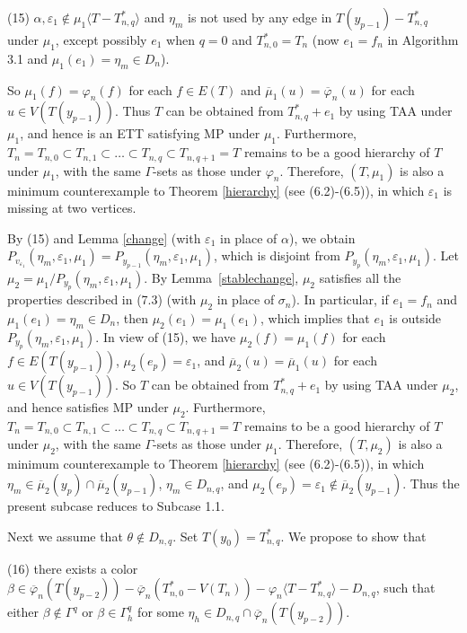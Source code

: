 \documentclass[11pt]{article}
\newcommand{\phibar}{\overline{\varphi}}
\begin{document}
(15) $\alpha, \varepsilon_1 \notin \mu_1 \langle T-T_{n,q}^* \rangle$ and $\eta_m$ is not used by any edge in 
$T(y_{p-1}) -  T_{n,q}^*$ under $\mu_1$, except possibly $e_1$ when $q=0$ and $T_{n,0}^*=T_n$ (now $e_1=f_n$ in 
Algorithm 3.1 and $\mu_1(e_1)=\eta_m \in D_n$). 

So $\mu_1(f)=\varphi_n(f)$ for each $f\in E(T)$ and $\overline{\mu}_1(u)= \overline{\varphi}_n(u)$ for each 
$u\in V(T(y_{p-1}))$. Thus $T$ can be obtained from $T_{n,q}^*+e_1$ by using TAA under $\mu_1$, and hence is an ETT 
satisfying MP under $\mu_1$. Furthermore, $T_n=T_{n,0} \subset T_{n,1} \subset 
\ldots \subset T_{n,q} \subset T_{n,q+1}=T$ remains to be a good hierarchy of $T$ under $\mu_1$, with the same 
$\Gamma$-sets as those under $\varphi_n$. Therefore, $(T, \mu_1)$ is also a minimum counterexample to Theorem 
\ref{hierarchy} (see (6.2)-(6.5)), in which $\varepsilon_1$ is missing at two vertices. 

By (15) and Lemma \ref{change} (with $\varepsilon_1$ in place of $\alpha$), we obtain $P_{v_{\varepsilon_1}}(\eta_m, 
\varepsilon_1, \mu_1) =P_{y_{p-1}}(\eta_m, \varepsilon_1, \mu_1)$, which is disjoint from $P_{y_{p}}(\eta_m, \varepsilon_1, 
\mu_1)$. Let $\mu_2=\mu_1/P_{y_{p}}(\eta_m, \varepsilon_1, \mu_1)$. By Lemma~\ref{stablechange}, $\mu_2$ satisfies all 
the properties described in (7.3) (with $\mu_2$ in place of $\sigma_n$).  
In particular, if $e_1=f_n$ and $\mu_1(e_1)=\eta_m \in D_n$, then $\mu_2(e_1)=\mu_1(e_1)$, which 
implies that $e_1$ is outside $P_{y_{p}}(\eta_m, \varepsilon_1, \mu_1)$.  In view of (15), we have 
$\mu_2(f)=\mu_1(f)$ for each $f\in E(T(y_{p-1}))$, $\mu_2(e_p)=\varepsilon_1$, and $\overline{\mu}_2(u)= \overline{\mu}_1(u)$ 
for each $u\in V(T(y_{p-1}))$. So $T$ can be obtained from $T_{n,q}^*+e_1$ by using TAA under $\mu_2$, and hence satisfies 
MP under $\mu_2$. Furthermore, $T_n=T_{n,0} \subset T_{n,1} \subset \ldots \subset T_{n,q} \subset T_{n,q+1}=T$ 
remains to be a good hierarchy of $T$ under $\mu_2$, with the same $\Gamma$-sets as those under $\mu_1$. 
Therefore, $(T, \mu_2)$ is also a minimum counterexample to Theorem \ref{hierarchy} (see (6.2)-(6.5)), in which $\eta_m \in\overline{\mu}_2(y_p)\cap\overline{\mu}_2(y_{p-1})$,  $\eta_m\in D_{n,q}$, and $\mu_2(e_p)=\varepsilon_1 \notin \overline{\mu}_2(y_{p-1})$. Thus the present subcase reduces to Subcase 1.1. 

Next we assume that $\theta\notin D_{n,q}$. Set $T(y_0)=T_{n,q}^*$. We propose to show that 

(16) there exists a color $\beta \in \overline{\varphi}_n(T(y_{p-2}))- \phibar_n(T_{n,0}^*-V(T_n)) - 
\varphi_n \langle T - T_{n,q}^* \rangle- D_{n,q}$, such that either $\beta \notin \Gamma^{q}$
or $\beta \in \Gamma^{q}_h$ for some $\eta_h \in D_{n,q}\cap \phibar_n(T(y_{p-2}))$.
\end{document}
